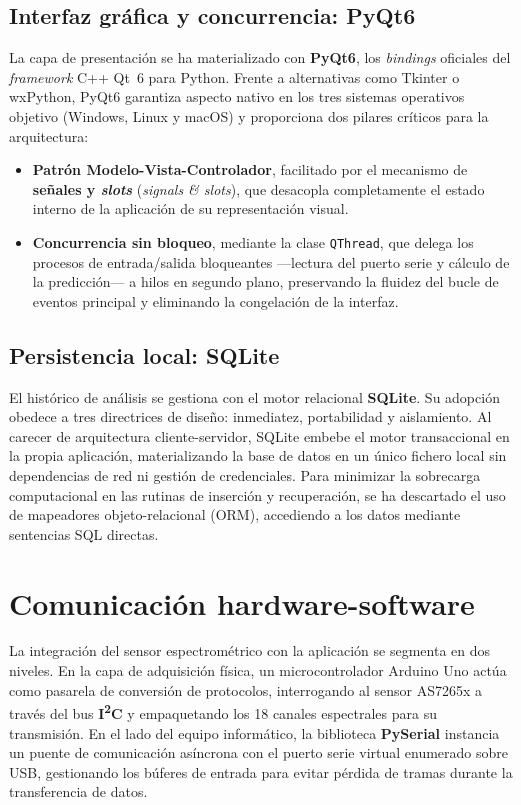 \subsection{Interfaz gráfica y concurrencia: PyQt6}

La capa de presentación se ha materializado con \textbf{PyQt6}, los \textit{bindings} oficiales del \textit{framework} C++ Qt~6 para Python. Frente a alternativas como Tkinter o wxPython, PyQt6 garantiza aspecto nativo en los tres sistemas operativos objetivo (Windows, Linux y macOS) y proporciona dos pilares críticos para la arquitectura:

\begin{itemize}
    \item \textbf{Patrón Modelo-Vista-Controlador}, facilitado por el mecanismo de \textbf{señales y \textit{slots}} (\textit{signals \& slots}), que desacopla completamente el estado interno de la aplicación de su representación visual.
    \item \textbf{Concurrencia sin bloqueo}, mediante la clase \texttt{QThread}, que delega los procesos de entrada/salida bloqueantes —lectura del puerto serie y cálculo de la predicción— a hilos en segundo plano, preservando la fluidez del bucle de eventos principal y eliminando la congelación de la interfaz.
\end{itemize}

\subsection{Persistencia local: SQLite}

El histórico de análisis se gestiona con el motor relacional \textbf{SQLite}. Su adopción obedece a tres directrices de diseño: inmediatez, portabilidad y aislamiento. Al carecer de arquitectura cliente-servidor, SQLite embebe el motor transaccional en la propia aplicación, materializando la base de datos en un único fichero local sin dependencias de red ni gestión de credenciales. Para minimizar la sobrecarga computacional en las rutinas de inserción y recuperación, se ha descartado el uso de mapeadores objeto-relacional (ORM), accediendo a los datos mediante sentencias SQL directas.

\section{Comunicación hardware-software}

La integración del sensor espectrométrico con la aplicación se segmenta en dos niveles. En la capa de adquisición física, un microcontrolador Arduino Uno actúa como pasarela de conversión de protocolos, interrogando al sensor AS7265x a través del bus \textbf{I\textsuperscript{2}C} y empaquetando los 18 canales espectrales para su transmisión. En el lado del equipo informático, la biblioteca \textbf{PySerial} instancia un puente de comunicación asíncrona con el puerto serie virtual enumerado sobre USB, gestionando los búferes de entrada para evitar pérdida de tramas durante la transferencia de datos.


